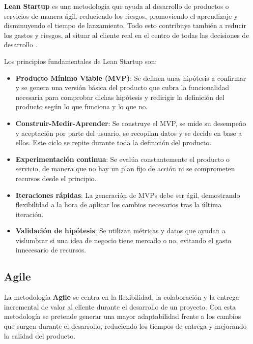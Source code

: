 \textbf{Lean Startup} es una metodología que ayuda al desarrollo de productos o servicios de manera ágil, reduciendo los riesgos, promoviendo el aprendizaje y disminuyendo el tiempo de lanzamiento. Todo esto contribuye también a reducir los gastos y riesgos, al situar al cliente real en el centro de todas las decisiones de desarrollo \cite{leanstartup}.

Los principios fundamentales de Lean Startup son:

\begin{itemize}
  \item \textbf{Producto Mínimo Viable (MVP)}: Se definen unas hipótesis a confirmar y se genera una versión básica del producto que cubra la funcionalidad necesaria para comprobar dichas hipótesis y redirigir la definición del producto según lo que funciona y lo que no.

  \item \textbf{Construir-Medir-Aprender}: Se construye el MVP, se mide su desempeño y aceptación por parte del usuario, se recopilan datos y se decide en base a ellos. Este ciclo se repite durante toda la definición del producto.

  \item \textbf{Experimentación continua}: Se evalúa constantemente el producto o servicio, de manera que no hay un plan fijo de acción ni se comprometen recursos desde el principio.

  \item \textbf{Iteraciones rápidas}: La generación de MVPs debe ser ágil, demostrando flexibilidad a la hora de aplicar los cambios necesarios tras la última iteración.

  \item \textbf{Validación de hipótesis}: Se utilizan métricas y datos que ayudan a vislumbrar si una idea de negocio tiene mercado o no, evitando el gasto innecesario de recursos.
\end{itemize}

\subsection{Agile}

La metodología \textbf{Agile} se centra en la flexibilidad, la colaboración y la entrega incremental de valor al cliente durante el desarrollo de un proyecto. Con esta metodología se pretende generar una mayor adaptabilidad frente a los cambios que surgen durante el desarrollo, reduciendo los tiempos de entrega y mejorando la calidad del producto.

